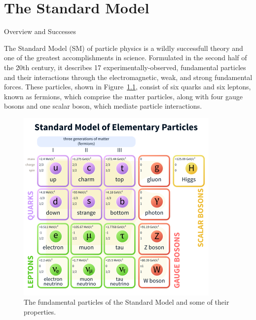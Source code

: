 \chapter{The Standard Model}
\begin{section}{Overview and Successes}

The Standard Model (SM) of particle physics is a wildly successfull theory and one of the greatest accomplishments in science.
Formulated in the second half of the 20th century, it describes 17 experimentally-observed, fundamental particles and their interactions through the electromagnetic, weak, and strong fundamental forces.
These particles, shown in Figure~\ref{fig:sm_particles}, consist of six quarks and six leptons, known as fermions, which comprise the matter particles, along with four gauge bosons and one scalar boson, which mediate particle interactions.

\begin{figure}[tbp!]
\begin{center}
\includegraphics[angle=0,width=0.80\columnwidth]{fig/sm_particles.png}
\end{center}
\caption{The fundamental particles of the Standard Model and some of their properties.}
\label{fig:sm_particles}
\end{figure}


\end{section}
